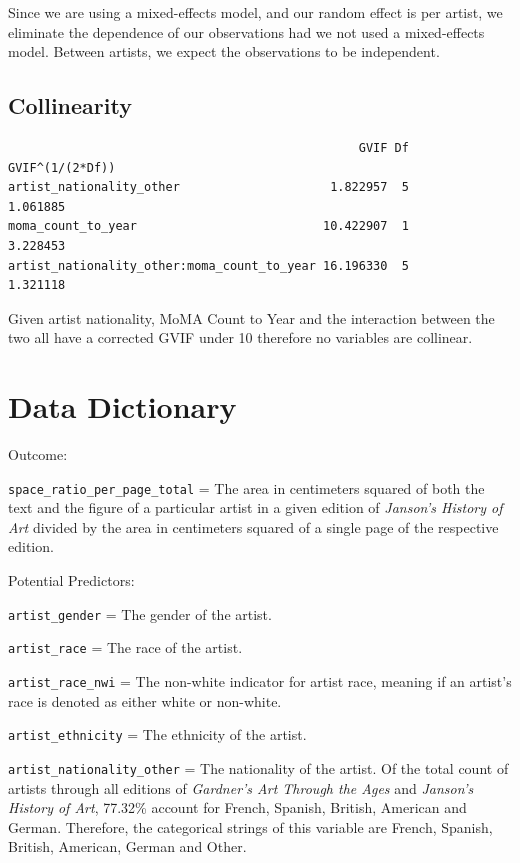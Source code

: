 \documentclass[
  letterpaper,
  DIV=11,
  numbers=noendperiod]{scrreprt}
\begin{document}
Since we are using a mixed-effects model, and our random effect is per
artist, we eliminate the dependence of our observations had we not used
a mixed-effects model. Between artists, we expect the observations to be
independent.

\hypertarget{collinearity}{%
\subsection{Collinearity}\label{collinearity}}

\begin{verbatim}
                                                 GVIF Df GVIF^(1/(2*Df))
artist_nationality_other                     1.822957  5        1.061885
moma_count_to_year                          10.422907  1        3.228453
artist_nationality_other:moma_count_to_year 16.196330  5        1.321118
\end{verbatim}

Given artist nationality, MoMA Count to Year and the interaction between
the two all have a corrected GVIF under 10 therefore no variables are
collinear.

\hypertarget{data-dictionary}{%
\section{Data Dictionary}\label{data-dictionary}}

Outcome:

\texttt{space\_ratio\_per\_page\_total} = The area in centimeters
squared of both the text and the figure of a particular artist in a
given edition of \emph{Janson's History of Art} divided by the area in
centimeters squared of a single page of the respective edition.

Potential Predictors:

\texttt{artist\_gender} = The gender of the artist.

\texttt{artist\_race} = The race of the artist.

\texttt{artist\_race\_nwi} = The non-white indicator for artist race,
meaning if an artist's race is denoted as either white or non-white.

\texttt{artist\_ethnicity} = The ethnicity of the artist.

\texttt{artist\_nationality\_other} = The nationality of the artist. Of
the total count of artists through all editions of \emph{Gardner's Art
Through the Ages} and \emph{Janson's History of Art}, 77.32\% account
for French, Spanish, British, American and German. Therefore, the
categorical strings of this variable are French, Spanish, British,
American, German and Other.
\end{document}

